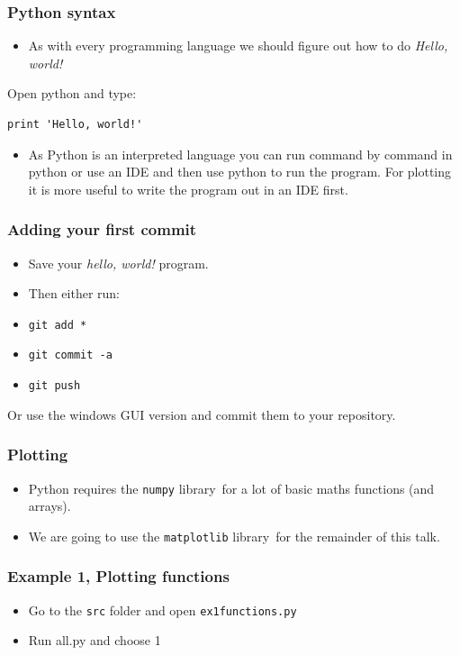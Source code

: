 \documentclass{beamer}
\begin{document}
\begin{frame}
\frametitle{Python syntax} 
\begin{itemize}
	\item As with every programming language we should figure out how to do \textit{Hello, world!}
\end{itemize}
Open python and type:
\begin{verbatim}
print 'Hello, world!'
\end{verbatim}
\begin{itemize}
\item As Python is an interpreted language you can run command by command in python or use an IDE and then use python to run the program. For plotting it is more useful to write the program out in an IDE first. 
\end{itemize}
\end{frame}

\begin{frame}
	\frametitle{Adding your first commit}
\begin{itemize}
	\item Save your \textit{hello, world!} program. 
	\item Then either run: 
	\item \texttt{git add *}
	\item \texttt{git commit -a}
	\item \texttt{git push}
\end{itemize}

Or use the windows GUI version and commit them to your repository.
\end{frame}


\begin{frame}
\frametitle{Plotting}
\begin{itemize}
	\item Python requires the \texttt{numpy} library\footnotemark\ for a lot of basic maths functions (and arrays).
	\item We are going to use the \texttt{matplotlib} library\footnotemark\ for the remainder of this talk. 
\end{itemize}
\end{frame}

\begin{frame}
\frametitle{Example 1, Plotting functions}
\begin{itemize}
	\item Go to the \texttt{src} folder and open \texttt{ex1functions.py} 
	\item Run all.py and choose 1 
\end{itemize}
\end{frame}
\end{document}
